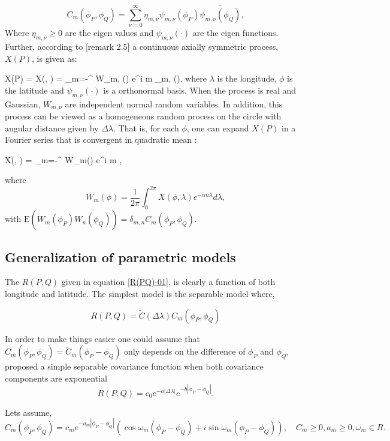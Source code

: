 	\[ C_m(\phi_P,\phi_Q) = \sum_{\nu=0}^{\infty} \eta_{m,\nu}\psi_{m,\nu}(\phi_P)\overline{\psi_{m,\nu}(\phi_Q)},  \]
	Where $\eta_{m,\nu}\ge 0$ are the eigen values and $\psi_{m,\nu}(\cdot)$ are the eigen functions.\\
	
	Further, according to \cite{Huang2012}[remark 2.5] a continuous axially symmetric process, $X(P)$, is given as:
	
	\beq
	X(P) = X(\phi, \lambda) = \sum_{m=-\infty}^{\infty} W_{m, \nu}(\phi) e^{i m \lambda}\psi_{m,\nu} (\phi),
	\eeq
	where $\lambda$ is the longitude, $\phi$ is the latitude and $\psi_{m,\nu}(\cdot)$ is a orthonormal basis. When the process is real and Gaussian, $W_{m,\nu}$ are independent normal random variables. In addition, this process can be viewed as a homogeneous random process on the circle with angular distance given by $\Delta \lambda$. That is, for each $\phi$, one can expand $X(P)$ in a Fourier series that is convergent in quadratic mean \cite{Roy1972}:
	
	\beq
	\label{eq:sym_process} X(\phi, \lambda) = \sum_{m=-\infty}^{\infty} W_m(\phi) e^{i m \lambda}
	\eeq,
	
	where
	\[
		W_m(\phi) = \frac{1}{2\pi} \int_0^{2\pi} X(\phi, \lambda) e^{-i m \lambda} d \lambda,
	\]
	with $\mbox{E}(W_m(\phi_P) \overline{W_n(\phi_Q)}) = \delta_{m,n} C_m(\phi_P, \phi_Q)$. \\
	
	\subsection{Generalization of parametric models}
	
	The $R(P,Q)$ given in equation \ref{R(PQ)-01}, is clearly a function of both longitude and latitude. The simplest model is the separable model where,
	
	\[
		R(P,Q) = \tilde{C}(\Delta\lambda)C_m(\phi_P,\phi_Q)
	\]
	
	In order to make things easier one could assume that $C_m(\phi_P, \phi_Q) = \tilde{C}_m(\phi_P - \phi_Q)$ only depends on the difference of $\phi_P$ and $\phi_Q$, \cite{HuangZhangRobeson2011} proposed a simple separable covariance function when both covariance components are exponential
	\[
		R(P, Q) = c_0e^{-a|\Delta \lambda|}e^{-b|\phi_P - \phi_Q|}.
	\]
	
	Lets assume,
	\[
		C_m(\phi_P,\phi_Q)=c_m e^{-a_m|\phi_P-\phi_Q|}(\cos\omega_m(\phi_P-\phi_Q)+i\sin\omega_m(\phi_P-\phi_Q)), \quad C_m \ge 0,a_m\ge0,\omega_m\in R.
	\]
	
